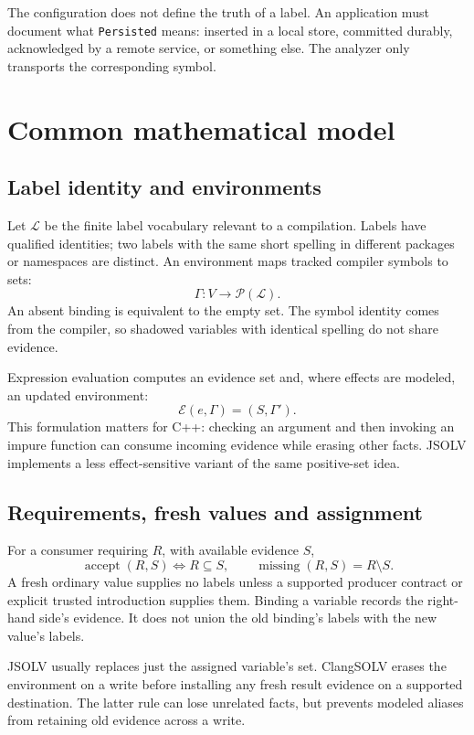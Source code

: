 \documentclass[11pt]{article}
\newcommand{\tags}{\mathcal{L}}
\newcommand{\env}{\Gamma}
\begin{document}
The configuration does not define the truth of a label. An application must
document what \texttt{Persisted} means: inserted in a local store, committed
durably, acknowledged by a remote service, or something else. The analyzer
only transports the corresponding symbol.

\section{Common mathematical model}
\subsection{Label identity and environments}
Let $\tags$ be the finite label vocabulary relevant to a compilation. Labels
have qualified identities; two labels with the same short spelling in
different packages or namespaces are distinct. An environment maps tracked
compiler symbols to sets:
\[
 \env:V\longrightarrow\mathcal{P}(\tags).
\]
An absent binding is equivalent to the empty set. The symbol identity comes
from the compiler, so shadowed variables with identical spelling do not
share evidence.

Expression evaluation computes an evidence set and, where effects are modeled,
an updated environment:
\[
 \mathcal{E}(e,\env)=(S,\env').
\]
This formulation matters for C++: checking an argument and then invoking an
impure function can consume incoming evidence while erasing other facts.
JSOLV implements a less effect-sensitive variant of the same positive-set
idea.

\subsection{Requirements, fresh values and assignment}
For a consumer requiring $R$, with available evidence $S$,
\[
 \operatorname{accept}(R,S)\iff R\subseteq S,
 \qquad\operatorname{missing}(R,S)=R\setminus S.
\]
A fresh ordinary value supplies no labels unless a supported producer contract
or explicit trusted introduction supplies them. Binding a variable records
the right-hand side's evidence. It does not union the old binding's labels
with the new value's labels.

JSOLV usually replaces just the assigned variable's set. ClangSOLV erases the
environment on a write before installing any fresh result evidence on a
supported destination. The latter rule can lose unrelated facts, but prevents
modeled aliases from retaining old evidence across a write.
\end{document}

